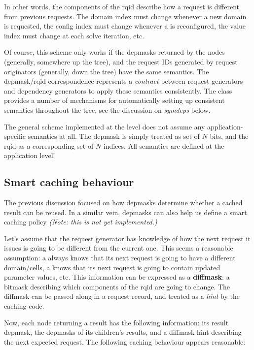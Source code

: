   In other words, the components of the rqid describe how a request is
  different from previous requests. The domain index must change whenever a new
  domain is requested, the config index must change whenever a  is
  reconfigured, the value index must change at each solve iteration, etc.

  Of course, this scheme only works if the depmasks returned by the nodes
  (generally, somewhere up the tree), and the request IDs generated by request
  originators (generally, down the tree) have the same semantics. The
  depmask/rqid correspondence represents a {\em contract} between request
  generators and dependency generators to apply these semantics consistently.
  The  class provides a number of mechanisms for automatically setting
  up consistent semantics throughout the tree, see the discussion on {\em
  symdeps} below.

  The general scheme implemented at the  level does not assume any
  application-specific semantics at all. The depmask is simply treated as set of $N$
  bits, and the rqid as a corresponding set of $N$ indices. All semantics are
  defined at the application level!

\subsection{Smart caching behaviour}

  The previous discussion focused on how depmasks determine whether a cached
  result can be reused. In a similar vein, depmasks can also help us define a
  smart caching policy {\em (Note: this is not yet implemented.)}
  
  Let's assume that the request generator has knowledge of how the next request
  it issues is going to be different from the current one. This seems a
  reasonable assumption: a  always knows that its next request is
  going to have a different domain/cells, a  knows that its next
  request is going to contain updated parameter values, etc. This information
  can be expressed as a {\bf diffmask}: a bitmask describing which components
  of the rqid are going to change. The diffmask can be passed along in a request
  record, and treated as a {\em hint} by the caching code.
  
  Now, each node returning a result has the following information: its result
  depmask, the depmasks of its children's results, and a diffmask hint 
  describing the next expected request. The following caching behaviour appears reasonable:
  
